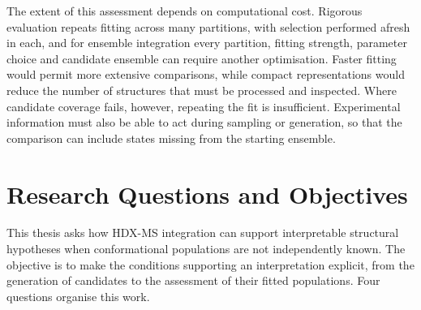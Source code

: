 The extent of this assessment depends on computational cost. Rigorous evaluation repeats fitting across many partitions, with selection performed afresh in each,\supercite{cawleyOverfittingModelSelection2010} and for ensemble integration every partition, fitting strength, parameter choice and candidate ensemble can require another optimisation. Faster fitting would permit more extensive comparisons, while compact representations would reduce the number of structures that must be processed and inspected. Where candidate coverage fails, however, repeating the fit is insufficient. Experimental information must also be able to act during sampling or generation, so that the comparison can include states missing from the starting ensemble.

\section{Research Questions and Objectives}
\label{sec:intro-questions}

This thesis asks how HDX-MS integration can support interpretable structural hypotheses when conformational populations are not independently known. The objective is to make the conditions supporting an interpretation explicit, from the generation of candidates to the assessment of their fitted populations. Four questions organise this work.

